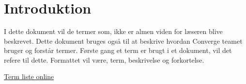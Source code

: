 \chapter{Introduktion}

I dette dokument vil de termer som, ikke er almen viden for læseren blive beskrevet. Dette dokument bruges også til at beskrive hvordan Converge teamet bruger og forstår termer. Første gang et term er brugt i et dokument, vil det refere til dette. Formattet vil være, term, beskrivelse og forkortelse.

\href{https://app.gitbook.com/@converge-1/s/workspace/document/terms}{Term liste online}